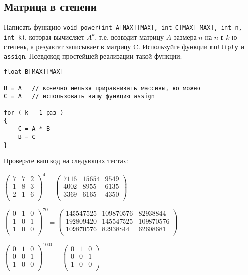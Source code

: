 \documentclass{article}
\begin{document}
\subsection{Матрица в степени}
Написать функцию \texttt{void power(int A[MAX][MAX], int C[MAX][MAX], int n, int k)}, которая вычисляет $A^k$, т.е. возводит матрицу $A$ размера $n$ на $n$ в $k$-ю степень, а результат записывает в матрицу C. Используйте функции \texttt{multiply} и \texttt{assign}. Псевдокод простейшей реализации такой функции:
\begin{lstlisting}
float B[MAX][MAX]

B = A   // конечно нельзя приравнивать массивы, но можно 
C = A   // использовать вашу функцию assign

for ( k - 1 раз )
{
	C = A * B
	B = C
}
\end{lstlisting}
Проверьте ваш код на следующих тестах:
\begin{center}

$
\begin{pmatrix}
7 & 7 & 2 \\
1 & 8 & 3 \\
2 & 1 & 6 \\
\end{pmatrix}^4 = 
\begin{pmatrix}
7116 & 15654 & 9549 \\
4002 & 8955 & 6135 \\
3369 & 6165 & 4350 \\
\end{pmatrix}
$
\end{center}



\begin{center}
$
\begin{pmatrix}
0 & 1 & 0 \\
1 & 0 & 1 \\
1 & 0 & 0 \\
\end{pmatrix}^{70} = 
\begin{pmatrix}
145547525 & 109870576 & 82938844 \\
192809420 & 145547525 & 109870576 \\
109870576 & 82938844 & 62608681 \\
\end{pmatrix}
$
\end{center}

\begin{center}
$
\begin{pmatrix}
0 & 1 & 0 \\
0 & 0 & 1 \\
1 & 0 & 0 \\
\end{pmatrix}^{1000} = 
\begin{pmatrix}
0 & 1 & 0 \\
0 & 0 & 1 \\
1 & 0 & 0 \\
\end{pmatrix}
$
\end{center}
\end{document}
